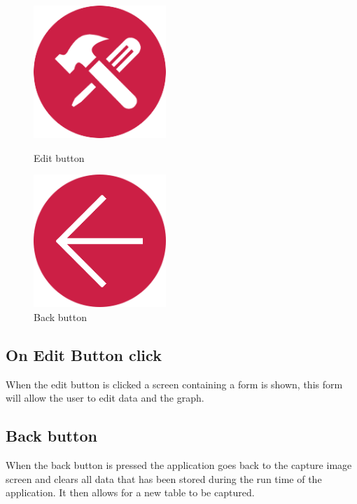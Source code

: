 \documentclass[a4paper,12pt]{article}
\begin{document}
\begin{figure}[H]
  \centering
  \begin{minipage}[b]{0.2\textwidth}
    \includegraphics[width=50mm]{images/editRed.png}
    \caption{Edit button}
  \end{minipage}
  \hfill
  \begin{minipage}[b]{0.2\textwidth}
    \includegraphics[width=50mm]{images/back.png}
    \caption{Back button}
  \end{minipage}
\end{figure}
\subsection{On Edit Button click}
When the edit button is clicked a screen containing a form is shown, this form will allow the user to edit data and the graph. 

\subsection{Back button}
When the back button is pressed the application goes back to the capture image screen and clears all data that has been stored during the run time of the application. It then allows for a new table to be captured.
\end{document}
